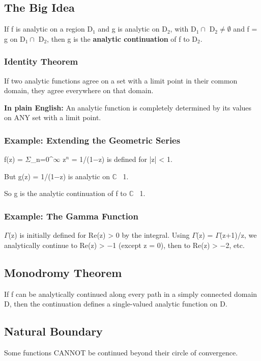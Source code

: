 \documentclass[12pt,a4paper,openany]{book}
\begin{document}
{{\subsection{The Big Idea}

If f is analytic on a region D$_1$ and g is analytic on D$_2$, with D$_1\cap$ D$_2\neq\emptyset$ and f = g on D$_1\cap$ D$_2$, then g is the \textbf{analytic continuation} of f to D$_2$.

\subsubsection{Identity Theorem }
If two analytic functions agree on a set with a limit point in their common domain, they agree everywhere on that domain.

\textbf{In plain English:} An analytic function is completely determined by its values on ANY set with a limit point.

\subsubsection{Example: Extending the Geometric Series}
f(z) = $\Sigma$_{n=0}^$\infty$ z$^n$ = 1/(1−z) is defined for |z| < 1.

But g(z) = 1/(1−z) is analytic on $\mathbb{C}$ \ {1}.

So g is the analytic continuation of f to $\mathbb{C}$ \ {1}.

\subsubsection{Example: The Gamma Function}
$\Gamma$(z) is initially defined for Re(z) > 0 by the integral. Using $\Gamma$(z) = $\Gamma$(z+1)/z, we analytically continue to Re(z) > −1 (except z = 0), then to Re(z) > −2, etc.

\subsection{Monodromy Theorem}
If f can be analytically continued along every path in a simply connected domain D, then the continuation defines a single-valued analytic function on D.

\subsection{Natural Boundary}
Some functions CANNOT be continued beyond their circle of convergence.

}}
\end{document}
